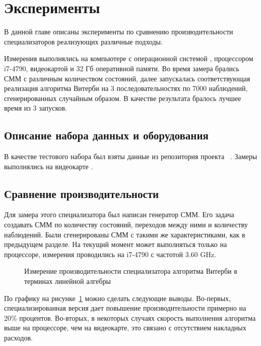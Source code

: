 \section{Эксперименты}
В данной главе описаны эксперименты по сравнению 
производительности специализаторов реализующих различные 
подходы.

Измерения выполнялись на компьютере с операционной системой 
, процессором  i7-4790, 
видеокартой  и 32 Гб 
оперативной памяти.
Во время замера брались СММ с различным количеством 
состояний, далее запускалась соответствующая реализация 
алгоритма Витерби на 3 последовательностях по 7000 
наблюдений, сгенерированных случайным образом.
В качестве результата бралось лучшее время из 3 
запусков.

\subsection{Описание набора данных и оборудования}
В качестве тестового набора был взяты данные из репозитория  
проекта ~\cite{cudampf}.
Замеры выполнялись на видеокарте .

\subsection{Сравнение производительности}
Для замера этого специализатора был написан генератор СММ.
Его задача создавать СММ по количеству состояний, переходов 
между ними и количеству наблюдений.
Были сгенерированы СММ с такими же характеристиками,
как в предыдущем разделе.
На текущий момент  может 
выполняться только на процессоре, измерения проводились на 
 i7-4790 с частотой 3.60 GHz.
\begin{figure}[h]
\centering
\caption{Измерение производительности специализатора алгоритма Витерби в терминах линейной алгебры}	
\label{LA_bench}
\end{figure}

По графику на рисунке~\ref{LA_bench} можно сделать следующие 
выводы.
Во-первых, специализированная версия дает повышение 
производительности примерно на 20\% процентов.
Во-вторых, в некоторых случаях скорость выполнения алгоритма 
выше на процессоре, чем на видеокарте, это связано с 
отсутствием накладных расходов.
